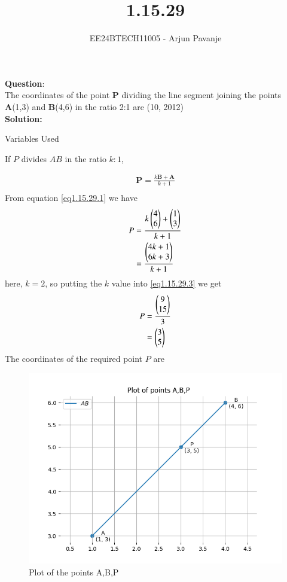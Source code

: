 \documentclass[journal]{IEEEtran}
\begin{document}

\vspace{3cm}

\title{1.15.29}
\author{EE24BTECH11005 - Arjun Pavanje
}
{\let\newpage\relax\maketitle}

\textbf{Question}:\\
The coordinates of the point \textbf{P} dividing the line segment joining the points \textbf{A}(1,3) and \textbf{B}(4,6) in the ratio 2:1 are
\hfill (10, 2012)
\\
\textbf{Solution: }
\begin{table}[h!]    
  \centering
  
  \caption{Variables Used}
  \label{tab1.15.29}
\end{table}
If $P$ divides $AB$ in the ratio $k:1$,


\begin{align} 
\textbf{P}=\frac{k\textbf{B}+\textbf{A}}{k+1} \label{eq1.15.29.1}\\
\end{align}
From equation \ref{eq1.15.29.1} we have
\begin{align}
P &= \frac{k
\begin{pmatrix}
4\\
6\end{pmatrix} +
\begin{pmatrix}
1\\
3\end{pmatrix}}{k+1} \label{eq1.15.29.2}\\
&= \frac{
\begin{pmatrix}
4k+1 \\
6k+3
\end{pmatrix}}{k+1} \label{eq1.15.29.3}
\end{align}
here, $k = 2$, so putting the $k$ value into \ref{eq1.15.29.3} we get
\begin{align}
P &= \frac{
\begin{pmatrix}
9\\
15
\end{pmatrix}}{3} \label{eq1.15.29.4}\\
&=
\begin{pmatrix}
3\\
5
	\end{pmatrix} \label{eq1.15.29.5}
\end{align}
The coordinates of the required point $P$ are
\begin{figure}[h!]
   \centering
   \includegraphics[width=0.7\linewidth]{figs/Figure_1.png}
   \caption{Plot of the points A,B,P}
   \label{stemplot}
\end{figure}
\end{document}
